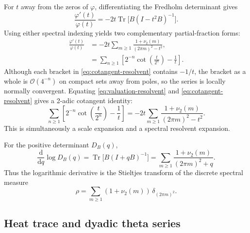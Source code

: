 \documentclass[11pt,oneside]{article}
\theoremstyle{definition}
\newcommand{\Tr}{\operatorname{Tr}}
\newcommand{\vtwo}{\nu_2}
\newcommand{\bigO}{\mathcal O}
\newcommand{\phiF}{\varphi}
\begin{document}
For \(t\) away from the zeros of \(\phiF\), differentiating the Fredholm determinant
gives
\begin{equation}
 \frac{\phiF'(t)}{\phiF(t)}
 =-2t\Tr\bigl[B(I-t^2B)^{-1}\bigr].
 \label{eq:resolvent-logderivative}
\end{equation}
Using either spectral indexing yields two complementary partial-fraction forms:
\begin{align}
 \frac{\phiF'(t)}{\phiF(t)}
 &=-2t\sum_{m\ge1}\frac{1+\vtwo(m)}{(2\pi m)^2-t^2},
 \label{eq:valuation-resolvent}\\
 &=\sum_{n\ge1}
 \left[2^{-n}\cot\!\left(\frac{t}{2^n}\right)-\frac1t\right].
 \label{eq:cotangent-resolvent}
\end{align}
Although each bracket in \eqref{eq:cotangent-resolvent} contains \(-1/t\), the bracket
as a whole is \(\bigO(4^{-n})\) on compact sets away from poles, so the series is
locally normally convergent.  Equating \eqref{eq:valuation-resolvent} and
\eqref{eq:cotangent-resolvent} gives a 2-adic cotangent identity:
\begin{equation}
 \sum_{n\ge1}
 \left[2^{-n}\cot\!\left(\frac{t}{2^n}\right)-\frac1t\right]
 =-2t\sum_{m\ge1}\frac{1+\vtwo(m)}{(2\pi m)^2-t^2}.
 \label{eq:cot-valuation-identity}
\end{equation}
This is simultaneously a scale expansion and a spectral resolvent expansion.

For the positive determinant \(D_B(q)\),
\begin{equation}
 \frac{\mathrm d}{\mathrm dq}\log D_B(q)
 =\Tr\bigl[B(I+qB)^{-1}\bigr]
 =\sum_{m\ge1}\frac{1+\vtwo(m)}{(2\pi m)^2+q}.
 \label{eq:Stieltjes-resolvent}
\end{equation}
Thus the logarithmic derivative is the Stieltjes transform of the discrete spectral
measure
\begin{equation}
 \rho=\sum_{m\ge1}(1+\vtwo(m))\,\delta_{(2\pi m)^2}.
 \label{eq:spectral-measure}
\end{equation}

\subsection{Heat trace and dyadic theta series}
\end{document}
